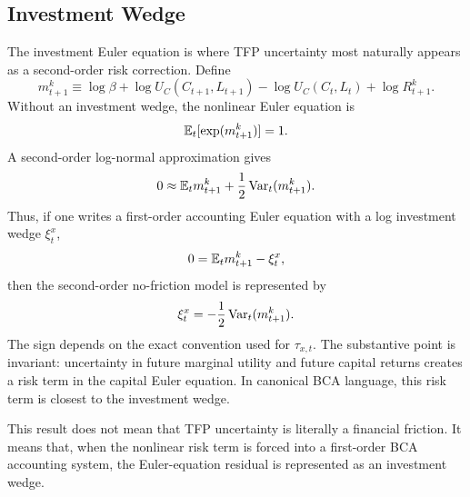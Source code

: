 \subsection{Investment Wedge}

The investment Euler equation is where TFP uncertainty most naturally appears
as a second-order risk correction. Define
\begin{equation}
    m^k_{t+1}
    \equiv
    \log\beta
    +
    \log U_C(C_{t+1},L_{t+1})
    -
    \log U_C(C_t,L_t)
    +
    \log R^k_{t+1}.
    \label{eq:capital_euler_log_return}
\end{equation}
Without an investment wedge, the nonlinear Euler equation is
\begin{equation}
    \mathbb{E}_t[\exp(m^k_{t+1})]=1.
    \label{eq:capital_euler_no_wedge}
\end{equation}
A second-order log-normal approximation gives
\begin{equation}
    0
    \approx
    \mathbb{E}_t m^k_{t+1}
    +
    \frac{1}{2}\operatorname{Var}_t(m^k_{t+1}).
    \label{eq:capital_euler_second_order}
\end{equation}
Thus, if one writes a first-order accounting Euler equation with a log
investment wedge \(\xi^x_t\),
\begin{equation}
    0
    =
    \mathbb{E}_t m^k_{t+1}
    -
    \xi^x_t,
    \label{eq:first_order_investment_wedge}
\end{equation}
then the second-order no-friction model is represented by
\begin{equation}
    \xi^x_t
    =
    -\frac{1}{2}\operatorname{Var}_t(m^k_{t+1}).
    \label{eq:investment_uncertainty_wedge}
\end{equation}
The sign depends on the exact convention used for \(\tau_{x,t}\). The substantive
point is invariant: uncertainty in future marginal utility and future capital
returns creates a risk term in the capital Euler equation. In canonical BCA
language, this risk term is closest to the investment wedge.

\begin{remark}
This result does not mean that TFP uncertainty is literally a financial
friction. It means that, when the nonlinear risk term is forced into a
first-order BCA accounting system, the Euler-equation residual is represented as
an investment wedge.
\end{remark}
